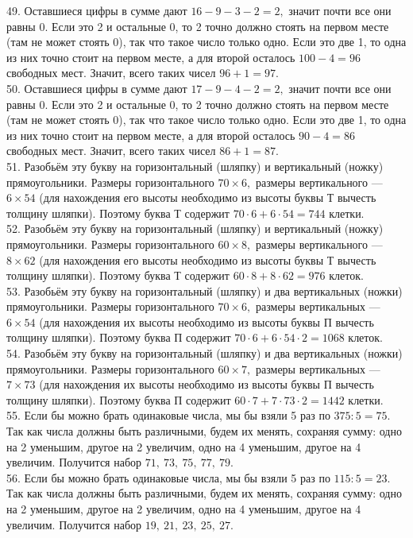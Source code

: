 49. Оставшиеся цифры в сумме дают $16-9-3-2=2,$ значит почти все они равны 0. Если это 2 и остальные 0, то 2 точно должно стоять на первом месте (там не может стоять 0), так что такое число только одно. Если это две 1, то одна из них точно стоит на первом месте, а для второй осталось $100-4=96$ свободных мест. Значит, всего таких чисел $96+1=97.$\\
50. Оставшиеся цифры в сумме дают $17-9-4-2=2,$ значит почти все они равны 0. Если это 2 и остальные 0, то 2 точно должно стоять на первом месте (там не может стоять 0), так что такое число только одно. Если это две 1, то одна из них точно стоит на первом месте, а для второй осталось $90-4=86$ свободных мест. Значит, всего таких чисел $86+1=87.$\\
51. Разобьём эту букву на горизонтальный (шляпку) и вертикальный (ножку) прямоугольники. Размеры горизонтального $70\times6,$ размеры вертикального --- $6\times54$ (для нахождения его высоты необходимо из высоты буквы Т вычесть толщину шляпки). Поэтому буква Т содержит $70\cdot6+6\cdot54=744$ клетки.\\
52. Разобьём эту букву на горизонтальный (шляпку) и вертикальный (ножку) прямоугольники. Размеры горизонтального $60\times8,$ размеры вертикального --- $8\times62$ (для нахождения его высоты необходимо из высоты буквы Т вычесть толщину шляпки). Поэтому буква Т содержит $60\cdot8+8\cdot62=976$ клеток.\\
53. Разобьём эту букву на горизонтальный (шляпку) и два вертикальных (ножки) прямоугольники. Размеры горизонтального $70\times6,$ размеры вертикальных --- $6\times54$ (для нахождения их высоты необходимо из высоты буквы П вычесть толщину шляпки). Поэтому буква П содержит $70\cdot6+6\cdot54\cdot2=1068$ клеток.\\
54. Разобьём эту букву на горизонтальный (шляпку) и два вертикальных (ножки) прямоугольники. Размеры горизонтального $60\times7,$ размеры вертикальных --- $7\times73$ (для нахождения их высоты необходимо из высоты буквы П вычесть толщину шляпки). Поэтому буква П содержит $60\cdot7+7\cdot73\cdot2=1442$ клетки.\\
55. Если бы можно брать одинаковые числа, мы бы взяли 5 раз по $375:5=75.$ Так как числа должны быть различными, будем их менять, сохраняя сумму: одно на 2 уменьшим, другое на 2 увеличим, одно на 4 уменьшим, другое на 4 увеличим. Получится набор $71,\ 73,\ 75,\ 77,\ 79.$\\
56. Если бы можно брать одинаковые числа, мы бы взяли 5 раз по $115:5=23.$ Так как числа должны быть различными, будем их менять, сохраняя сумму: одно на 2 уменьшим, другое на 2 увеличим, одно на 4 уменьшим, другое на 4 увеличим. Получится набор $19,\ 21,\ 23,\ 25,\ 27.$\\
